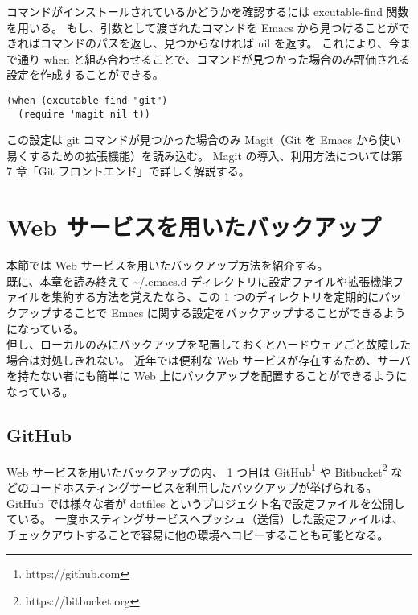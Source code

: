 コマンドがインストールされているかどうかを確認するには excutable-find 関数を用いる。
もし、引数として渡されたコマンドを Emacs から見つけることができればコマンドのパスを返し、見つからなければ nil を返す。
これにより、今まで通り when と組み合わせることで、コマンドが見つかった場合のみ評価される設定を作成することができる。
\begin{mdframed}[roundcorner=0.50zw,leftmargin=3.00zw,rightmargin=3.00zw,skipabove=0.40zw,skipbelow=0.40zw,innertopmargin=4.00pt,innerbottommargin=4.00pt,innerleftmargin=5.00pt,innerrightmargin=5.00pt,linecolor=gray!020,linewidth=0.50pt,backgroundcolor=gray!20]
\begin{verbatim}
(when (excutable-find "git")
  (require 'magit nil t))
\end{verbatim}
\end{mdframed}
この設定は git コマンドが見つかった場合のみ Magit（Git を Emacs から使い易くするための拡張機能）を読み込む。
Magit の導入、利用方法については第 7 章「Git フロントエンド」で詳しく解説する。
\section{Web サービスを用いたバックアップ}
本節では Web サービスを用いたバックアップ方法を紹介する。\\

既に、本章を読み終えて \textasciitilde{}/.emacs.d ディレクトリに設定ファイルや拡張機能ファイルを集約する方法を覚えたなら、この 1 つのディレクトリを定期的にバックアップすることで Emacs に関する設定をバックアップすることができるようになっている。\\

但し、ローカルのみにバックアップを配置しておくとハードウェアごと故障した場合は対処しきれない。\enlargethispage{1.00zw}
近年では便利な Web サービスが存在するため、サーバを持たない者にも簡単に Web 上にバックアップを配置することができるようになっている。
\subsection{GitHub}
Web サービスを用いたバックアップの内、 1 つ目は GitHub\footnote{https://github.com} や Bitbucket\footnote{https://bitbucket.org} などのコードホスティングサービスを利用したバックアップが挙げられる。
GitHub では様々な者が dotfiles というプロジェクト名で設定ファイルを公開している。
一度ホスティングサービスへプッシュ（送信）した設定ファイルは、チェックアウトすることで容易に他の環境へコピーすることも可能となる。\\

